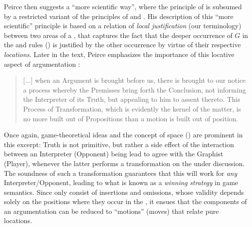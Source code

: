 \begin{scope}
\begin{scope}
Peirce then suggests a ``more scientific way'', where the principle of
 is subsumed by a restricted variant of the principles of
 and . His description of this ``more scientific''
 principle is based on a relation of \emph{local
justification} (our terminology) between two areas of a , that
captures the fact that the deeper occurrence of $G$ in the  and
 rules () is justified by the other occurrence by virtue
of their respective \emph{locations}. Later in the text, Peirce emphasizes the
importance of this locative aspect of argumentation
\cite[pp.~544--545]{peirce_prolegomena_1906}:

\begin{quote}%
[...] when an Argument is brought before us, there is brought to our notice a%
process whereby the Premisses bring forth the Conclusion, not informing the%
Interpreter of its Truth, but appealing to him to assent thereto. This Process%
of Transformation, which is evidently the kernel of the matter, is no more built%
out of Propositions than a motion is built out of position.%
\end{quote}

Once again, game-theoretical ideas and the concept of space
() are prominent in this excerpt: Truth is not primitive,
but rather a side effect of the interaction between an Interpreter (Opponent)
being lead to agree with the Graphist (Player), whenever the latter performs a
transformation on the  under discussion. The soundness of such a
transformation guarantees that this will work for \emph{any}
Interpreter/Opponent, leading to what is known as a \emph{winning strategy} in
game semantics. Since  only consist of insertions
and omissions, whose validity depends solely on the positions where they occur
in the , it ensues that the components of an argumentation can be
reduced to ``motions'' (moves) that relate pure locations.


\end{scope}
\end{scope}
